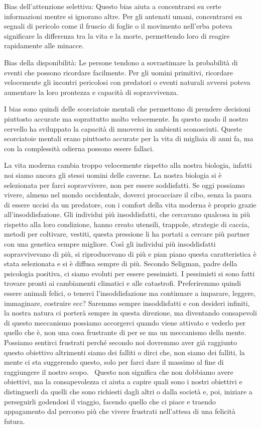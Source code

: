 \documentclass[12pt]{book} %
\begin{document}
Bias dell'attenzione selettiva: Questo bias aiuta a concentrarsi su certe informazioni mentre si
ignorano altre. Per gli antenati umani, concentrarsi su segnali di pericolo come il fruscio di foglie o il movimento
nell'erba poteva significare la differenza tra la vita e la morte, permettendo loro di reagire
rapidamente alle minacce.

Bias della disponibilità: Le persone tendono a sovrastimare la probabilità di eventi che possono ricordare facilmente.
Per gli uomini primitivi, ricordare velocemente gli incontri pericolosi con predatori o eventi naturali avversi poteva
aumentare la loro prontezza e capacità di sopravvivenza.

I bias sono quindi delle scorciatoie mentali che permettono di prendere decisioni piuttosto accurate ma soprattutto
molto velocemente. In questo modo il nostro cervello ha sviluppato la capacità di muoversi in ambienti sconosciuti.
Queste scorciatoie mentali erano piuttosto accurate per la vita di migliaia di anni fa, ma con la complessità odierna
possono essere fallaci.

La vita moderna cambia troppo velocemente rispetto alla nostra biologia, infatti noi siamo ancora gli stessi uomini
delle caverne. La nostra biologia si è selezionata per farci sopravvivere, non per essere soddisfatti. Se oggi possiamo
vivere, almeno nel mondo occidentale, doverci procacciare il cibo, senza la paura di essere uccisi da un predatore, con
i comfort della vita moderna è proprio grazie all'insoddisfazione. Gli individui più
insoddisfatti, che cercavano qualcosa in più rispetto alla loro condizione, hanno creato utensili, trappole, strategie
di caccia, metodi per coltivare, vestiti, questa pressione li ha portati a cercare più partner con una genetica sempre
migliore. Così gli individui più insoddisfatti sopravvivevano di più, si riproducevano di più e pian piano questa
caratteristica è stata selezionata e si è diffusa sempre di più. Secondo Seligman, padre della psicologia positiva, ci
siamo evoluti per essere pessimisti. I pessimisti si sono fatti trovare pronti ai cambiamenti climatici e alle
catastrofi. Preferiremmo quindi essere animali felici, o tenerci l'insoddisfazione ma continuare a
imparare, leggere, immaginare, costruire ecc? Saremmo sempre insoddisfatti e con desideri infiniti, la nostra natura ci
porterà sempre in questa direzione, ma diventando consapevoli di questo meccanismo possiamo accorgerci quando viene
attivato e vederlo per quello che è, non una cosa frustrante di per se ma un meccanismo della mente. Possiamo sentirci
frustrati perché secondo noi dovremmo aver già raggiunto questo obiettivo altrimenti siamo dei falliti o dirci che, non
siamo dei falliti, la mente ci sta suggerendo questo, solo per farci dare il massimo al fine di raggiungere il nostro
scopo. \ Questo non significa che non dobbiamo avere obiettivi, ma la consapevolezza ci aiuta a capire quali sono i
nostri obiettivi e distinguerli da quelli che sono richiesti dagli altri o dalla società e, poi, iniziare a perseguirli
godendosi il viaggio, facendo quello che ci piace e traendo appagamento dal percorso più che vivere frustrati
nell'attesa di una felicità futura.
\end{document}
